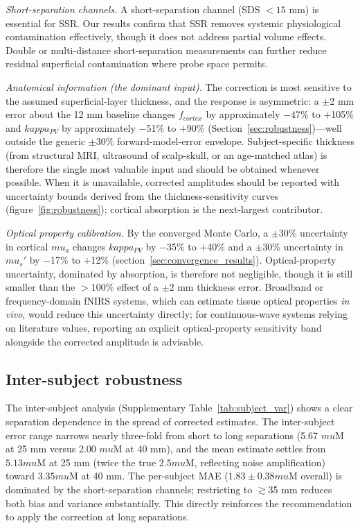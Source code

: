 \documentclass[11pt]{article}
\def\kappa{kappa}%
\def\mu{mu}%
\def\mathrm#1{#1}%
\def\,{ }%
\begin{document}
\textit{Short-separation channels.} A short-separation channel (SDS $< 15$\,mm) is essential for SSR. Our results confirm that SSR removes systemic physiological contamination effectively, though it does not address partial volume effects. Double or multi-distance short-separation measurements\cite{r38} can further reduce residual superficial contamination where probe space permits.

\textit{Anatomical information (the dominant input).} The correction is most sensitive to the assumed superficial-layer thickness, and the response is asymmetric: a $\pm$2\,mm error about the 12\,mm baseline changes $f_{\mathrm{cortex}}$ by approximately $-$47\% to $+$105\% and $\kappa_{\mathrm{PV}}$ by approximately $-$51\% to $+$90\% (Section~\ref{sec:robustness})---well outside the generic $\pm$30\% forward-model-error envelope. Subject-specific thickness (from structural MRI, ultrasound of scalp-skull, or an age-matched atlas) is therefore the single most valuable input and should be obtained whenever possible. When it is unavailable, corrected amplitudes should be reported with uncertainty bounds derived from the thickness-sensitivity curves (figure~\ref{fig:robustness}); cortical absorption is the next-largest contributor.

\textit{Optical property calibration.} By the converged Monte Carlo, a $\pm$30\% uncertainty in cortical $\mu_a$ changes $\kappa_{\mathrm{PV}}$ by $-$35\% to $+$40\% and a $\pm$30\% uncertainty in $\mu_s'$ by $-$17\% to $+$12\% (section~\ref{sec:convergence_results}). Optical-property uncertainty, dominated by absorption, is therefore not negligible, though it is still smaller than the $>$100\% effect of a $\pm$2\,mm thickness error. Broadband or frequency-domain fNIRS systems, which can estimate tissue optical properties \textit{in vivo}, would reduce this uncertainty directly; for continuous-wave systems relying on literature values, reporting an explicit optical-property sensitivity band alongside the corrected amplitude is advisable.

\subsection{Inter-subject robustness}

The inter-subject analysis (Supplementary Table~\ref{tab:subject_var}) shows a clear separation dependence in the spread of corrected estimates. The inter-subject error range narrows nearly three-fold from short to long separations (5.67\,$\mu$M at 25\,mm versus 2.00\,$\mu$M at 40\,mm), and the mean estimate settles from $5.13\,\mu$M at 25\,mm (twice the true $2.5\,\mu$M, reflecting noise amplification) toward $3.35\,\mu$M at 40\,mm. The per-subject MAE ($1.83 \pm 0.38\,\mu$M overall) is dominated by the short-separation channels; restricting to $\gtrsim$35\,mm reduces both bias and variance substantially. This directly reinforces the recommendation to apply the correction at long separations.
\end{document}

